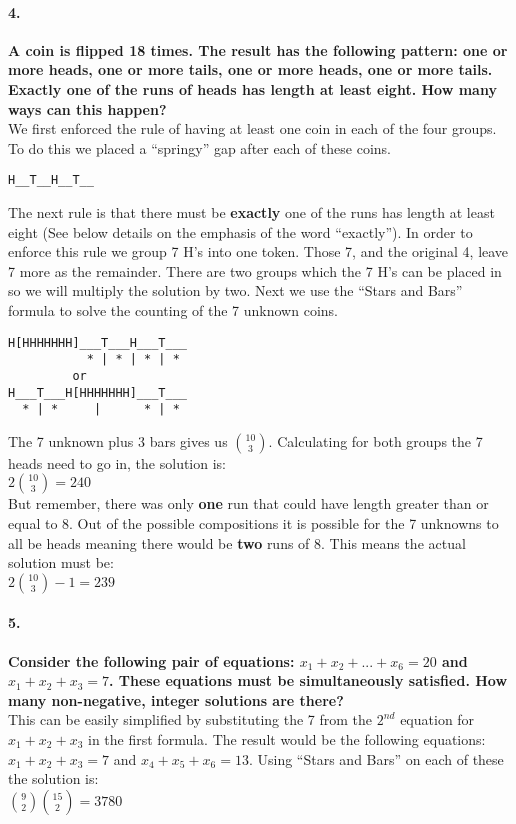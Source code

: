 \documentclass{article}
\begin{document}
\paragraph{4. }
\textbf{A coin is flipped 18 times. The result has the following pattern: one or more heads, one or more tails, one or more heads, one or more tails. Exactly one of the runs of heads has length at least eight. How many ways can this happen?}\\
We first enforced the rule of having at least one coin in each of the four groups. To do this we placed a ``springy'' gap after each of these coins.
\begin{verbatim}
H__T__H__T__
\end{verbatim}
The next rule is that there must be \textbf{exactly} one of the runs has length at least eight (See below details on the emphasis of the word ``exactly'').
In order to enforce this rule we group 7 H's into one token. Those 7, and the original 4, leave 7 more as the remainder. There are two groups which the 7 H's can be placed in so we will multiply the solution by two. Next we use the ``Stars and Bars'' formula to solve the counting of the 7 unknown coins.
\begin{verbatim}
H[HHHHHHH]___T___H___T___
           * | * | * | *
         or
H___T___H[HHHHHHH]___T___
  * | *     |      * | *
\end{verbatim}
The 7 unknown plus 3 bars gives us ${10 \choose 3}$. Calculating for both groups the 7 heads need to go in, the solution is:\\
$2{10 \choose 3} = 240$\\
But remember, there was only \textbf{one} run that could have length greater than or equal to 8. Out of the possible compositions it is possible for the 7 unknowns to all be heads meaning there would be \textbf{two} runs of 8. This means the actual solution must be:\\
$\boxed{2{10 \choose 3} - 1 = 239}$

\paragraph{5. }
\textbf{Consider the following pair of equations: $x_1 + x_2 + . . . + x_6 = 20$ and $x_1 + x_2 + x_3 = 7$. These equations must be simultaneously satisfied. How many non-negative, integer solutions are there?}\\
This can be easily simplified by substituting the 7 from the $2^{nd}$ equation for $x_1+x_2+x_3$ in the first formula. The result would be the following equations:\\
$x_1+x_2+x_3 = 7$ and $x_4+x_5+x_6 = 13$.
Using ``Stars and Bars'' on each of these the solution is:\\
 $\boxed{{9 \choose 2}{15 \choose 2} = 3780}$
\end{document}
